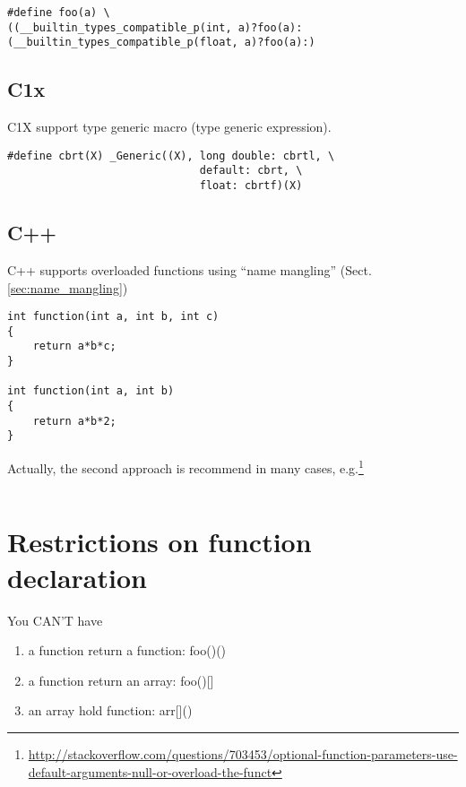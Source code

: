 \begin{enumerate}
\begin{verbatim}
#define foo(a) \
((__builtin_types_compatible_p(int, a)?foo(a):(__builtin_types_compatible_p(float, a)?foo(a):)
\end{verbatim}  


\end{enumerate}

\subsection{C1x}
\label{sec:overloaded-function_C1X}

C1X support type generic macro (type generic expression).

\begin{verbatim}
#define cbrt(X) _Generic((X), long double: cbrtl, \
                              default: cbrt, \
                              float: cbrtf)(X)
\end{verbatim}




\subsection{C++}
 
C++ supports overloaded functions using ``name mangling''
(Sect.\ref{sec:name_mangling})
 
\begin{verbatim}
int function(int a, int b, int c)
{
    return a*b*c;
}

int function(int a, int b)
{
    return a*b*2;
}
\end{verbatim}

Actually, the second approach is recommend in many cases,
e.g.\footnote{\url{http://stackoverflow.com/questions/703453/optional-function-parameters-use-default-arguments-null-or-overload-the-funct}}
\begin{verbatim}

\end{verbatim}

\section{Restrictions on function declaration}


You CAN'T have
\begin{enumerate}
  \item a function return a function: foo()()
  \item a function return an array: foo()[]
  \item an array hold function: arr[]()
\end{enumerate}

